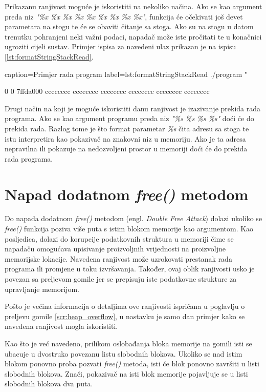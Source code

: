 \documentclass[times, utf8, diplomski, numeric]{fer}
\begin{document}
Prikazanu ranjivost moguće je iskoristiti na nekoliko načina.
Ako se kao argument preda niz \emph{"\%x \%x \%x \%x \%x \%x
\%x \%x \%x"}, funkcija će očekivati još devet parametara na
stogu te će se obaviti čitanje sa stoga. Ako su na stogu u
datom trenutku pohranjeni neki važni podaci, napadač može iste
pročitati te u konačnici ugroziti cijeli sustav. Primjer ispisa
za navedeni ulaz prikazan je na ispisu 
\ref{lst:formatStringStackRead}.

\begin{ispis} {caption=Primjer rada program} {label=lst:formatStringStackRead}
./program "%

0 0 7ffda000 cccccccc cccccccc cccccccc cccccccc cccccccc cccccccc
\end{ispis}

Drugi način na koji je moguće iskoristiti danu ranjivost je
izazivanje prekida rada programa. Ako se kao argument
programu preda niz \emph{"\%s \%s \%s \%s"} doći će do prekida rada.
Razlog tome je što format parametar \emph{\%s} čita adresu sa
stoga te istu interpretira kao pokazivač na znakovni niz u
memoriju. Ako je ta adresa nepravilna ili pokazuje na
nedozvoljeni prostor u memoriji doći će do prekida rada programa.

\section{Napad dodatnom \emph{free()} metodom}

Do napada dodatnom \emph{free()} metodom (engl. \emph{Double Free
Attack}) dolazi ukoliko se \emph{free()} funkcija poziva više
puta s istim blokom memorije kao argumentom. Kao posljedica,
dolazi do korupcije podatkovnih struktura u memoriji čime se
napadaču omogućava upisivanje proizvoljnih vrijednosti na
proizvoljne memorijske lokacije. Navedena ranjivost može
uzrokovati prestanak rada programa ili promjene u toku
izvršavanja. Također, ovaj oblik ranjivosti usko je povezan sa
preljevom gomile jer se prepisuju iste podatkovne strukture za
upravljanje memorijom.

Pošto je većina informacija o detaljima ove ranjivosti ispričana
u poglavlju o preljevu gomile \ref{scr:heap_overflow}, u nastavku
je samo dan primjer kako se navedena ranjivost mogla iskoristiti.

Kao što je već navedeno, prilikom oslobađanja bloka memorije na
gomili isti se ubacuje u dvostruko povezanu listu slobodnih
blokova. Ukoliko se nad istim blokom ponovno proba pozvati
\emph{free()} metoda, isti će blok ponovno završiti u listi
slobodnih blokova. Znači, pokazivač na isti blok memorije
pojavljuje se u listi slobodnih blokova dva puta.
\end{document}
